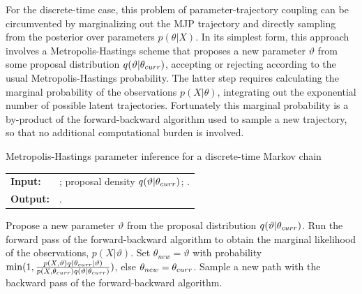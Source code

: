 For the discrete-time case, this problem of parameter-trajectory
coupling can be circumvented by marginalizing out the MJP trajectory 
and directly sampling from the posterior over parameters $p(\theta|X)$.
In its simplest form, this approach involves a Metropolis-Hastings
scheme that proposes a new parameter $\vartheta$ from some proposal distribution 
$q(\vartheta|\theta_{curr})$, accepting or rejecting according to the usual
Metropolis-Hastings probability. The latter step requires calculating the 
marginal probability of the observations $p(X|\theta)$, integrating out
the exponential number of possible latent trajectories. Fortunately
this marginal probability is a by-product of the forward-backward
algorithm used to sample a new trajectory, so that no 
additional computational burden is involved. 
\begin{algorithm}[H]
  \caption{Metropolis-Hastings parameter inference for a discrete-time 
Markov chain}
   \label{alg:disc_time_mh}
  \begin{tabular}{l l}
   \textbf{Input:  } & \text{Observations $X$};
   proposal density $q(\vartheta|\theta_{curr})$; 
   \text{previous parameters $\ctheta$ }.\\
   \textbf{Output:  }& \text{A new Markov chain parameter $\ntheta$}.\\
   \hline
   \end{tabular}
   \begin{algorithmic}[1]
  \State Propose a new parameter $\vartheta$ from the proposal distribution
  $q(\vartheta|\theta_{curr})$.
  \State Run the forward pass of the forward-backward algorithm to 
    obtain the marginal likelihood of the observations, $p(X|\vartheta)$.
    \State Set $\theta_{new} = \vartheta$ with probability 
    $\min(1,\frac{p(X,\vartheta)q(\theta_{curr}|\vartheta)}{p(X,\theta_{curr})q(\vartheta|\theta_{curr})})$, else 
    $\theta_{new} = \theta_{curr}$.
  \State Sample a new path with
    the backward pass of the forward-backward algorithm.
\end{algorithmic}
\end{algorithm}

